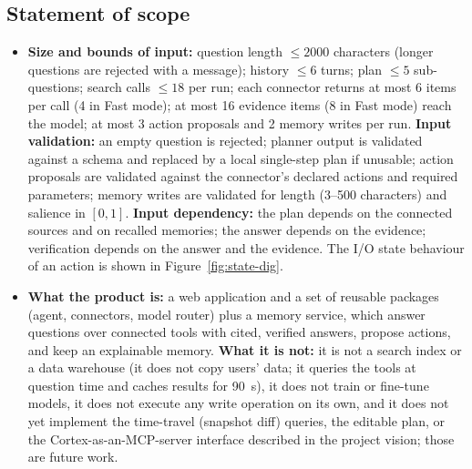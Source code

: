 \documentclass[oneside,a4paper,12pt]{report}
\begin{document}
 \subsection{Statement of scope}
	\begin{itemize}
	\item	\textbf{Size and bounds of input:} question length $\le 2000$ characters (longer questions are rejected with a message); history $\le 6$ turns; plan $\le 5$ sub-questions; search calls $\le 18$ per run; each connector returns at most 6 items per call (4 in Fast mode); at most 16 evidence items (8 in Fast mode) reach the model; at most 3 action proposals and 2 memory writes per run. \textbf{Input validation:} an empty question is rejected; planner output is validated against a schema and replaced by a local single-step plan if unusable; action proposals are validated against the connector's declared actions and required parameters; memory writes are validated for length (3--500 characters) and salience in $[0,1]$. \textbf{Input dependency:} the plan depends on the connected sources and on recalled memories; the answer depends on the evidence; verification depends on the answer and the evidence. The I/O state behaviour of an action is shown in Figure~\ref{fig:state-dig}.
	\item \textbf{What the product is:} a web application and a set of reusable packages (agent, connectors, model router) plus a memory service, which answer questions over connected tools with cited, verified answers, propose actions, and keep an explainable memory. \textbf{What it is not:} it is not a search index or a data warehouse (it does not copy users' data; it queries the tools at question time and caches results for 90~s), it does not train or fine-tune models, it does not execute any write operation on its own, and it does not yet implement the time-travel (snapshot diff) queries, the editable plan, or the Cortex-as-an-MCP-server interface described in the project vision; those are future work.
	\end{itemize}
\end{document}
